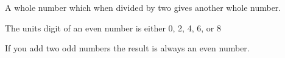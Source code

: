 A whole number which when divided by two gives another whole number. 
\par
The units digit of an even number is either 0, 2, 4, 6, 
or 8
\par
If you add two odd numbers the result is always an even number.